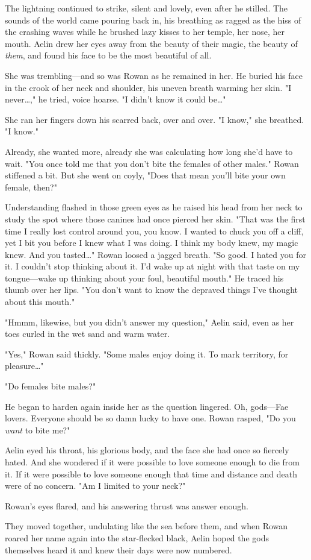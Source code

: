 The lightning continued to strike, silent and lovely, even after he stilled.
The sounds of the world came pouring back in, his breathing as ragged as the hiss of the crashing waves while he brushed lazy kisses to her temple, her nose, her mouth.
Aelin drew her eyes away from the beauty of their magic, the beauty of \emph{them}, and found his face to be the most beautiful of all.

She was trembling---and so was Rowan as he remained in her.
He buried his face in the crook of her neck and shoulder, his uneven breath warming her skin.
"I never\ldots ," he tried, voice hoarse.
"I didn't know it could be\ldots"

She ran her fingers down his scarred back, over and over.
"I know," she breathed.
"I know."

Already, she wanted more, already she was calculating how long she'd have to wait.
"You once told me that you don't bite the females of other males."
Rowan stiffened a bit.
But she went on coyly, "Does that mean  you'll bite your own female, then?"

Understanding flashed in those green eyes as he raised his head from her neck to study the spot where those canines had once pierced her skin.
"That was the first time I really lost control around you, you know.
I wanted to chuck you off a cliff, yet I bit you before I knew what I was doing.
I think my body knew, my magic knew.
And you tasted\ldots" Rowan loosed a jagged breath.
"So good.
I hated you for it.
I couldn't stop thinking about it.
I'd wake up at night with that taste on my tongue---wake up thinking about your foul, beautiful mouth."
He traced his thumb over her lips.
"You don't want to know the depraved things I've thought about this mouth."

"Hmmm, likewise, but you didn't answer my question," Aelin said, even as her toes curled in the wet sand and warm water.

"Yes," Rowan said thickly.
"Some males enjoy doing it.
To mark territory, for pleasure\ldots"

"Do females bite males?"

He began to harden again inside her as the question lingered.
Oh, gods---Fae lovers.
Everyone should be so damn lucky to have one.
Rowan rasped, "Do you \emph{want} to bite me?"

Aelin eyed his throat, his glorious body, and the face she had once so fiercely hated.
And she wondered if it were possible to love someone enough to die from it.
If it were possible to love someone enough that time and distance and death were of no concern.
"Am I limited to your neck?"

Rowan's eyes flared, and his answering thrust was answer enough.

They moved together, undulating like the sea before them, and when Rowan roared her name again into the star-flecked black, Aelin hoped the gods themselves heard it and knew their days were now numbered.
